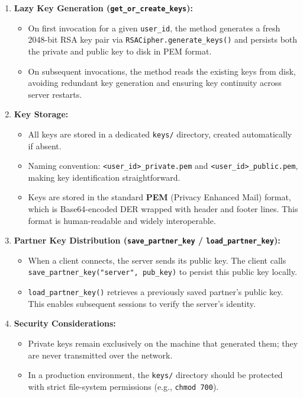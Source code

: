 \documentclass[12pt,a4paper]{article}
\begin{document}
\begin{enumerate}
    \item \textbf{Lazy Key Generation (\texttt{get\_or\_create\_keys}):}
    \begin{itemize}
        \item On first invocation for a given \texttt{user\_id}, the method generates a fresh 2048-bit RSA key pair via \texttt{RSACipher.generate\_keys()} and persists both the private and public key to disk in PEM format.
        \item On subsequent invocations, the method reads the existing keys from disk, avoiding redundant key generation and ensuring key continuity across server restarts.
    \end{itemize}
    
    \item \textbf{Key Storage:}
    \begin{itemize}
        \item All keys are stored in a dedicated \texttt{keys/} directory, created automatically if absent.
        \item Naming convention: \texttt{<user\_id>\_private.pem} and \texttt{<user\_id>\_public.pem}, making key identification straightforward.
        \item Keys are stored in the standard \textbf{PEM} (Privacy Enhanced Mail) format, which is Base64-encoded DER wrapped with header and footer lines. This format is human-readable and widely interoperable.
    \end{itemize}
    
    \item \textbf{Partner Key Distribution (\texttt{save\_partner\_key} / \texttt{load\_partner\_key}):}
    \begin{itemize}
        \item When a client connects, the server sends its public key. The client calls \texttt{save\_partner\_key("server", pub\_key)} to persist this public key locally.
        \item \texttt{load\_partner\_key()} retrieves a previously saved partner's public key. This enables subsequent sessions to verify the server's identity.
    \end{itemize}
    
    \item \textbf{Security Considerations:}
    \begin{itemize}
        \item Private keys remain exclusively on the machine that generated them; they are never transmitted over the network.
        \item In a production environment, the \texttt{keys/} directory should be protected with strict file-system permissions (e.g., \texttt{chmod 700}).
    \end{itemize}
\end{enumerate}
\end{document}
